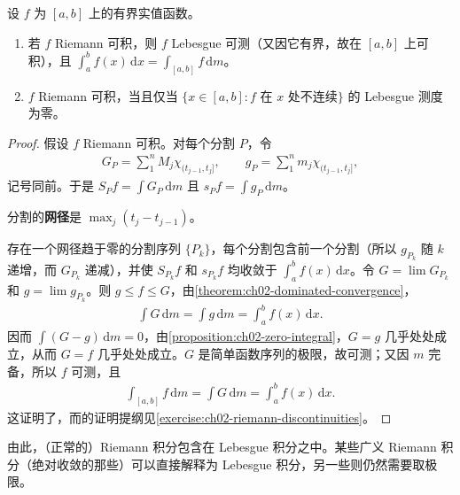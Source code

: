 \documentclass[../../main.tex]{subfiles}%
\begin{document}
\begin{theorem}\label{theorem:ch02-riemann-lebesgue}
设 $f$ 为 $[a,b]$ 上的有界实值函数。
\begin{enumerate}
\item\label{item:ch02-riemann-lebesgue-equality} 若 $f$ Riemann 可积，则 $f$ Lebesgue 可测（又因它有界，故在 $[a,b]$ 上可积），且 $\int_a^b f(x)\,\mathrm{d}x=\int_{[a,b]}f\,\mathrm{d}m$。
\item\label{item:ch02-riemann-discontinuities} $f$ Riemann 可积，当且仅当 $\{x\in[a,b]:f\text{ 在 }x\text{ 处不连续}\}$ 的 Lebesgue 测度为零。
\end{enumerate}
\end{theorem}
\begin{proof}
假设 $f$ Riemann 可积。对每个分割 $P$，令
\begin{align*}
G_P=\sum_1^n M_j\chi_{(t_{j-1},t_j]},\qquad
g_P=\sum_1^n m_j\chi_{(t_{j-1},t_j]},
\end{align*}
记号同前。于是 $S_Pf=\int G_P\,\mathrm{d}m$ 且 $s_Pf=\int g_P\,\mathrm{d}m$。
\begin{definition*}[分割的网径]
分割的\textbf{网径}是 $\max_j(t_j-t_{j-1})$。
\end{definition*}
存在一个网径趋于零的分割序列 $\{P_k\}$，每个分割包含前一个分割（所以 $g_{P_k}$ 随 $k$ 递增，而 $G_{P_k}$ 递减），并使 $S_{P_k}f$ 和 $s_{P_k}f$ 均收敛于 $\int_a^b f(x)\,\mathrm{d}x$。令 $G=\lim G_{P_k}$ 和 $g=\lim g_{P_k}$。则 $g\le f\le G$，由\cref{theorem:ch02-dominated-convergence}，
\begin{align*}
\int G\,\mathrm{d}m=\int g\,\mathrm{d}m=\int_a^b f(x)\,\mathrm{d}x.
\end{align*}
因而 $\int(G-g)\,\mathrm{d}m=0$，由\cref{proposition:ch02-zero-integral}，$G=g$ 几乎处处成立，从而 $G=f$ 几乎处处成立。$G$ 是简单函数序列的极限，故可测；又因 $m$ 完备，所以 $f$ 可测，且
\begin{align*}
\int_{[a,b]}f\,\mathrm{d}m=\int G\,\mathrm{d}m=\int_a^b f(x)\,\mathrm{d}x.
\end{align*}
这证明了，而的证明提纲见\cref{exercise:ch02-riemann-discontinuities}。
\end{proof}
由此，（正常的）Riemann 积分包含在 Lebesgue 积分之中。某些广义 Riemann 积分（绝对收敛的那些）可以直接解释为 Lebesgue 积分，另一些则仍然需要取极限。
\end{document}
